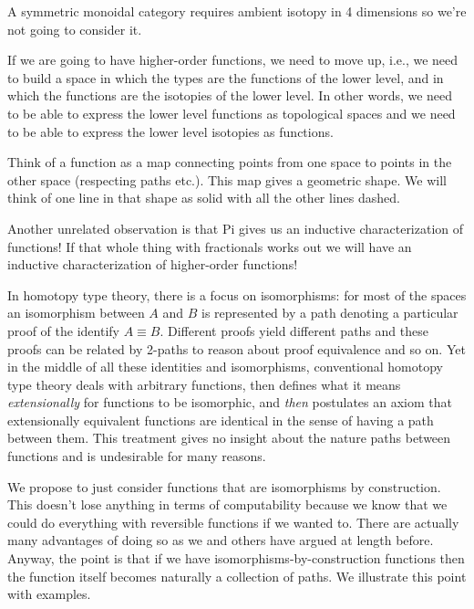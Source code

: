 \documentclass[11pt]{article}
\begin{document}
A symmetric monoidal category requires ambient isotopy in 4 dimensions so
we're not going to consider it.

If we are going to have higher-order functions, we need to move up, i.e., we
need to build a space in which the types are the functions of the lower
level, and in which the functions are the isotopies of the lower level. In
other words, we need to be able to express the lower level functions as
topological spaces and we need to be able to express the lower level
isotopies as functions. 

Think of a function as a map connecting points from one space to points in
the other space (respecting paths etc.). This map gives a geometric shape. We
will think of one line in that shape as solid with all the other lines dashed.

Another unrelated observation is that Pi gives us an inductive
characterization of functions! If that whole thing with fractionals
works out we will have an inductive characterization of higher-order
functions! 

In homotopy type theory, there is a focus on isomorphisms: for most of the
spaces an isomorphism between $A$ and $B$ is represented by a path denoting a
particular proof of the identify $A \equiv B$. Different proofs yield
different paths and these proofs can be related by 2-paths to reason about
proof equivalence and so on. Yet in the middle of all these identities and
isomorphisms, conventional homotopy type theory deals with arbitrary
functions, then defines what it means \emph{extensionally} for functions to
be isomorphic, and \emph{then} postulates an axiom that extensionally
equivalent functions are identical in the sense of having a path between
them. This treatment gives no insight about the nature paths between
functions and is undesirable for many reasons. 

We propose to just consider functions that are isomorphisms by
construction. This doesn't lose anything in terms of computability because we
know that we could do everything with reversible functions if we wanted
to. There are actually many advantages of doing so as we and others have
argued at length before. Anyway, the point is that if we have
isomorphisms-by-construction functions then the function itself becomes
naturally a collection of paths. We illustrate this point with examples.
\end{document}
